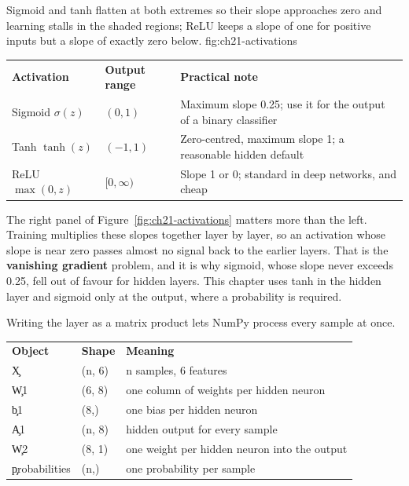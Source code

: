 
{Sigmoid and tanh flatten at both extremes so their slope approaches zero and learning stalls in the shaded regions; ReLU keeps a slope of one for positive inputs but a slope of exactly zero below.}
{fig:ch21-activations}

\begin{center}
\begin{tabular}{lll}
\textbf{Activation} & \textbf{Output range} & \textbf{Practical note} \\
Sigmoid $\sigma(z)$ & $(0, 1)$ & Maximum slope 0.25; use it for the output of a binary classifier \\
Tanh $\tanh(z)$ & $(-1, 1)$ & Zero-centred, maximum slope 1; a reasonable hidden default \\
ReLU $\max(0, z)$ & $[0, \infty)$ & Slope 1 or 0; standard in deep networks, and cheap \\
\end{tabular}
\end{center}

The right panel of Figure~\ref{fig:ch21-activations} matters more than the left.
Training multiplies these slopes together layer by layer, so an activation whose
slope is near zero passes almost no signal back to the earlier layers. That is
the \textbf{vanishing gradient} problem, and it is why sigmoid, whose slope never
exceeds 0.25, fell out of favour for hidden layers. This chapter uses tanh in the
hidden layer and sigmoid only at the output, where a probability is required.


Writing the layer as a matrix product lets NumPy process every sample at once.

\begin{center}
\begin{tabular}{lll}
\textbf{Object} & \textbf{Shape} & \textbf{Meaning} \\
\c{X} & (n, 6) & n samples, 6 features \\
\c{W1} & (6, 8) & one column of weights per hidden neuron \\
\c{b1} & (8,) & one bias per hidden neuron \\
\c{A1} & (n, 8) & hidden output for every sample \\
\c{W2} & (8, 1) & one weight per hidden neuron into the output \\
\c{probabilities} & (n,) & one probability per sample \\
\end{tabular}
\end{center}

